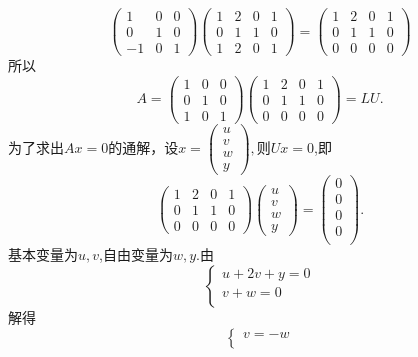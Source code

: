 ﻿\documentclass{book} \usepackage{exsheets} \usepackage{xeCJK}
\begin{document}
\begin{solution}
 $$ 
 \begin{pmatrix}
   1&0&0\\
   0&1&0\\
   -1&0&1
 \end{pmatrix}
 \begin{pmatrix}
   1&2&0&1\\
   0&1&1&0\\
   1&2&0&1
 \end{pmatrix}=
 \begin{pmatrix}
   1&2&0&1\\
   0&1&1&0\\
   0&0&0&0
 \end{pmatrix}
 $$
 所以
$$
A=
\begin{pmatrix}
  1&0&0\\
  0&1&0\\
  1&0&1
\end{pmatrix}
\begin{pmatrix}
  1&2&0&1\\
  0&1&1&0\\
  0&0&0&0
\end{pmatrix}=LU.
$$
为了求出$Ax=0$的通解，设$x=
\begin{pmatrix}
  u\\
  v\\
  w\\
  y
\end{pmatrix}, $则$Ux=0$,即
$$
\begin{pmatrix}
  1&2&0&1\\
  0&1&1&0\\
  0&0&0&0
\end{pmatrix}
\begin{pmatrix}
  u\\
  v\\
  w\\
  y
\end{pmatrix}=
\begin{pmatrix}
  0\\
  0\\
  0\\
  0\\
\end{pmatrix}.
$$
基本变量为$u,v$,自由变量为$w,y$.由
$$
\begin{cases}
  u+2v+y=0\\
  v+w=0\\
\end{cases}
$$
解得
$$
\begin{cases}
  v=-w\\

\end{cases}$$
\end{solution}
\end{document}
